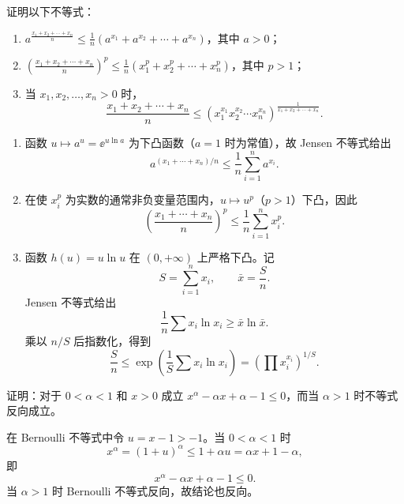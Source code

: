 \begin{xexercise}[4]
证明以下不等式：
  \begin{enumerate}[label=(\arabic*)]
    \item $\displaystyle a^{\frac{x_1+x_2+\cdots+x_n}{n}}
    \le\frac1n(a^{x_1}+a^{x_2}+\cdots+a^{x_n})$，其中 $a>0$；
    \item $\displaystyle\left(\frac{x_1+x_2+\cdots+x_n}{n}\right)^p
    \le\frac1n(x_1^p+x_2^p+\cdots+x_n^p)$，其中 $p>1$；
    \item 当 $x_1,x_2,\ldots,x_n>0$ 时，
    \[
      \frac{x_1+x_2+\cdots+x_n}{n}
      \le\left(x_1^{x_1}x_2^{x_2}\cdots x_n^{x_n}\right)^{\frac1{x_1+x_2+\cdots+x_n}}.
    \]
  \end{enumerate}
\end{xexercise}
\begin{xsolution}
\begin{enumerate}[label=(\arabic*)]
  \item 函数 $u\mapsto a^u=\ee^{u\ln a}$ 为下凸函数（$a=1$ 时为常值），故 Jensen 不等式给出
  \[
    a^{(x_1+\cdots+x_n)/n}\le\frac1n\sum_{i=1}^n a^{x_i}.
  \]

  \item 在使 $x_i^p$ 为实数的通常非负变量范围内，$u\mapsto u^p$（$p>1$）下凸，因此
  \[
    \left(\frac{x_1+\cdots+x_n}{n}\right)^p
    \le\frac1n\sum_{i=1}^n x_i^p.
  \]

  \item 函数 $h(u)=u\ln u$ 在 $(0,+\infty)$ 上严格下凸。记
  \[
    S=\sum_{i=1}^n x_i,\qquad \bar x=\frac Sn.
  \]
  Jensen 不等式给出
  \[
    \frac1n\sum x_i\ln x_i\ge\bar x\ln\bar x.
  \]
  乘以 $n/S$ 后指数化，得到
  \[
    \frac Sn\le
    \exp\left(\frac1S\sum x_i\ln x_i\right)
    =\left(\prod x_i^{x_i}\right)^{1/S}.
  \]
\end{enumerate}
\end{xsolution}


\begin{xexercise}[5]
证明：对于 $0<\alpha<1$ 和 $x>0$ 成立 $x^\alpha-\alpha x+\alpha-1\le0$，而当 $\alpha>1$ 时不等式反向成立。
\end{xexercise}
\begin{xsolution}
在 Bernoulli 不等式中令 $u=x-1>-1$。当 $0<\alpha<1$ 时
\[
  x^\alpha=(1+u)^\alpha\le1+\alpha u=\alpha x+1-\alpha,
\]
即
\[
  x^\alpha-\alpha x+\alpha-1\le0.
\]
当 $\alpha>1$ 时 Bernoulli 不等式反向，故结论也反向。
\end{xsolution}


